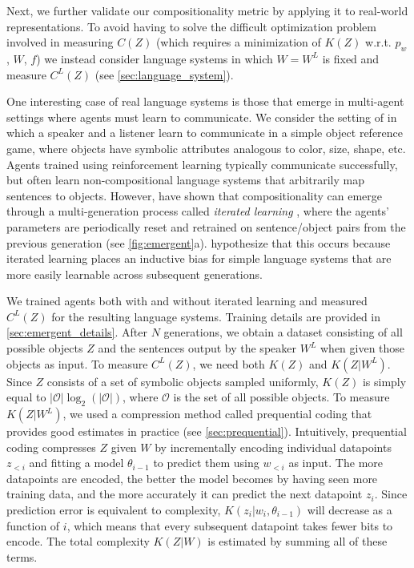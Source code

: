 \documentclass{article}
\begin{document}
Next, we further validate our compositionality metric by applying it to real-world representations. To avoid having to solve the difficult optimization problem involved in measuring $C(Z)$ (which requires a minimization of $K(Z)$ w.r.t. $p_w$, $W$, $f$) we instead consider language systems in which $W = W^L$ is fixed and measure $C^L(Z)$ (see \cref{sec:language_system}).

One interesting case of real language systems is those that emerge in multi-agent settings where agents must learn to communicate. We consider the setting of \citet{li2019ease,ren2020compositional} in which a speaker and a listener learn to communicate in a simple object reference game, where objects have symbolic attributes analogous to color, size, shape, etc. Agents trained using reinforcement learning typically communicate successfully, but often learn non-compositional language systems that arbitrarily map sentences to objects. However, \citet{li2019ease,ren2020compositional} have shown that compositionality can emerge through a multi-generation process called \textit{iterated learning} \citep{kirby2015compression}, where the agents' parameters are periodically reset and retrained on sentence/object pairs from the previous generation (see \cref{fig:emergent}a). \citet{kirby2015compression} hypothesize that this occurs because iterated learning places an inductive bias for simple language systems that are more easily learnable across subsequent generations.

We trained agents both with and without iterated learning and measured $C^L(Z)$ for the resulting language systems. Training details are provided in \cref{sec:emergent_details}. After $N$ generations, we obtain a dataset consisting of all possible objects $Z$ and the sentences output by the speaker $W^L$ when given those objects as input. To measure $C^L(Z)$, we need both $K(Z)$ and $K(Z|W^L)$. Since $Z$ consists of a set of symbolic objects sampled uniformly, $K(Z)$ is simply equal to $|\mathcal{O}|\log_2(|\mathcal{O}|)$, where $\mathcal{O}$ is the set of all possible objects. To measure $K(Z|W^L)$, we used a compression method called prequential coding \citep{blier2018description} that provides good estimates in practice (see \cref{sec:prequential}). Intuitively, prequential coding compresses $Z$ given $W$ by incrementally encoding individual datapoints $z_{<i}$ and fitting a model $\theta_{i-1}$ to predict them using $w_{<i}$ as input. The more datapoints are encoded, the better the model becomes by having seen more training data, and the more accurately it can predict the next datapoint $z_i$. Since prediction error is equivalent to complexity, $K(z_i|w_i, \theta_{i-1})$ will decrease as a function of $i$, which means that every subsequent datapoint takes fewer bits to encode. The total complexity $K(Z|W)$ is estimated by summing all of these terms.
\end{document}
